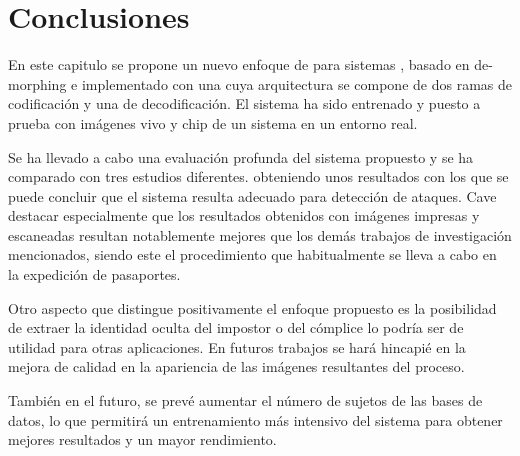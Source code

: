 \section{Conclusiones} \label{sec:MorphingConclusiones}

En este capitulo se propone un nuevo enfoque de  para sistemas , basado en \gls{de-morphing} e implementado con una  cuya arquitectura se compone de dos ramas de codificación y una de decodificación. El sistema ha sido entrenado y puesto a prueba con imágenes \gls{vivo} y \gls{chip} de un sistema  en un entorno real.

Se ha llevado a cabo una evaluación profunda del sistema propuesto y se ha comparado con tres estudios diferentes. obteniendo unos resultados con los que se puede concluir que el sistema resulta adecuado para detección de ataques. Cave destacar especialmente que los resultados obtenidos con imágenes impresas y escaneadas resultan notablemente mejores que los demás trabajos de investigación mencionados, siendo este el procedimiento que habitualmente se lleva a cabo en la expedición de pasaportes. 

Otro aspecto que distingue positivamente el enfoque propuesto es la posibilidad de extraer la identidad oculta del impostor o del cómplice lo podría ser de utilidad para otras aplicaciones. En futuros trabajos se hará hincapié en la mejora de calidad en la apariencia de las imágenes resultantes del proceso.

También en el futuro, se prevé aumentar el número de sujetos de las bases de datos, lo que permitirá un entrenamiento más intensivo del sistema para obtener mejores resultados y un mayor rendimiento.




